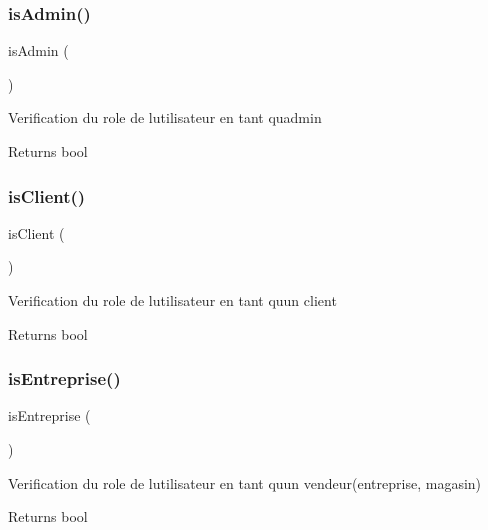\subsubsection{\texorpdfstring{is\+Admin()}{isAdmin()}}
{\footnotesize\ttfamily is\+Admin (\begin{DoxyParamCaption}{ }\end{DoxyParamCaption})}

Verification du role de l\textquotesingle{}utilisateur en tant qu\textquotesingle{}admin \begin{DoxyReturn}{Returns}
bool 
\end{DoxyReturn}
\mbox{\label{class_app_1_1_user_ac72b53b5ba1db08b2dbc3146d05d5c07}} 
\subsubsection{\texorpdfstring{is\+Client()}{isClient()}}
{\footnotesize\ttfamily is\+Client (\begin{DoxyParamCaption}{ }\end{DoxyParamCaption})}

Verification du role de l\textquotesingle{}utilisateur en tant qu\textquotesingle{}un client \begin{DoxyReturn}{Returns}
bool 
\end{DoxyReturn}
\mbox{\label{class_app_1_1_user_ad59f1d979560f3653c06b29d26a46cbd}} 
\subsubsection{\texorpdfstring{is\+Entreprise()}{isEntreprise()}}
{\footnotesize\ttfamily is\+Entreprise (\begin{DoxyParamCaption}{ }\end{DoxyParamCaption})}

Verification du role de l\textquotesingle{}utilisateur en tant qu\textquotesingle{}un vendeur(entreprise, magasin) \begin{DoxyReturn}{Returns}
bool 
\end{DoxyReturn}
\mbox{\label{class_app_1_1_user_a7d57b7b59a41f1e62a9162798054aee1}} 
